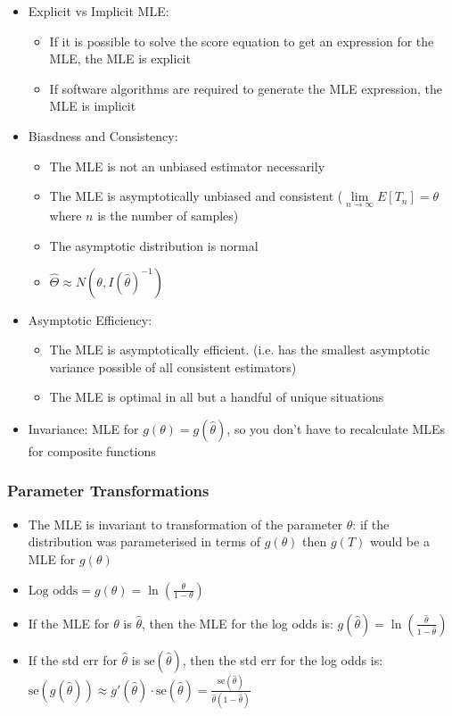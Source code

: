 \documentclass{article}
\begin{document}
\begin{itemize}
    \item Explicit vs Implicit MLE:
    \begin{itemize}
        \item If it is possible to solve the score equation to get an expression for the MLE, the MLE is explicit
        \item If software algorithms are required to generate the MLE expression, the MLE is implicit
    \end{itemize}
    \item Biasdness and Consistency:
    \begin{itemize}
        \item The MLE is not an unbiased estimator necessarily
        \item The MLE is asymptotically unbiased and consistent ($\lim\limits_{n \to \infty} E[T_n]=\theta$ where $n$ is the number of samples)
        \item The asymptotic distribution is normal
        \item $\hat{\Theta} \approx N(\theta,I(\hat{\theta})^{-1})$
    \end{itemize}
    \item Asymptotic Efficiency:
    \begin{itemize}
        \item The MLE is asymptotically efficient. (i.e. has the smallest asymptotic variance possible of all consistent estimators)
        \item The MLE is optimal in all but a handful of unique situations
    \end{itemize}
    \item Invariance: MLE for $g(\theta)=g(\hat{\theta})$, so you don't have to recalculate MLEs for composite functions
\end{itemize}

\subsubsection{Parameter Transformations}

\begin{itemize}
    \item The MLE is invariant to transformation of the parameter $\theta$: if the distribution was parameterised in terms of $g(\theta)$ then $g(T)$ would be a MLE for $g(\theta)$
    \item $\text{Log odds}=g(\theta)=\ln (\frac{\theta}{1-\theta})$
    \item If the MLE for $\theta$ is $\hat{\theta}$, then the MLE for the log odds is: $g(\hat{\theta})= \ln (\frac{\hat{\theta}}{1-\hat{\theta}})$
    \item If the std err for $\hat{\theta}$ is $\text{se}(\hat{\theta})$, then the std err for the log odds is: $\text{se}(g(\hat{\theta})) \approx g'(\hat{\theta}) \cdot \text{se}(\hat{\theta})=\frac{\text{se}(\hat{\theta})}{\hat{\theta}(1-\hat{\theta})}$
\end{itemize}
\end{document}
